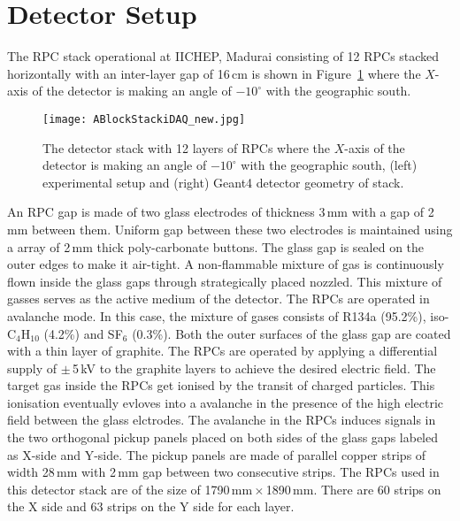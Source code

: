 \section{Detector Setup} \label{sec:detectorA}
The RPC stack operational at IICHEP, Madurai consisting of 12 RPCs
stacked horizontally with an inter-layer gap of 16\,cm is shown in
Figure~\ref{fig:stack} where the $X$-axis of the detector is making an
angle of $-10^\circ$ with the geographic south.
\begin{figure}[h]
  \centering
  \texttt{[image: ABlockStackiDAQ\_new.jpg]} 
  \caption{The detector stack with 12 layers of RPCs where the
    $X$-axis of the detector is making an angle of $-10^\circ$ with
    the geographic south, (left) experimental setup and (right) Geant4
    detector geometry of stack.}
  \label{fig:stack}
\end{figure}
An RPC gap is made of two glass electrodes of thickness 3\,mm with
a gap of 2\,mm between them. Uniform gap between these two electrodes
is maintained using a array of 2\,mm thick poly-carbonate buttons.
The glass gap is sealed on the outer edges to make it air-tight.
A non-flammable mixture of gas is continuously
flown inside the glass gaps through strategically placed nozzled.
This mixture of gasses serves as the active medium of the detector.
The RPCs are operated in avalanche mode. In this case, the mixture of
gases consists of R134a (95.2\%), iso-C$_4$H$_{10}$ (4.2\%) and
SF$_6$ (0.3\%). Both the outer surfaces of the glass gap are coated
with a thin layer of graphite. The RPCs are operated by applying
a differential supply of $\pm$\,5\,kV to the graphite layers to
achieve the desired electric field. The target gas inside the RPCs get
ionised by the transit of charged particles. This ionisation eventually
evloves into a avalanche in the presence of the high electric field
between the glass elctrodes. The avalanche in the RPCs induces
signals in the two orthogonal pickup panels placed on both sides of
the glass gaps labeled as X-side and Y-side. The pickup
panels are made of parallel copper strips of width 28\,mm with 2\,mm
gap between two consecutive strips. The RPCs used in this detector
stack are of the size of 1790\,mm\,$\times$\,1890\,mm. There are
60 strips on the X side and 63 strips on the Y side for each layer.

